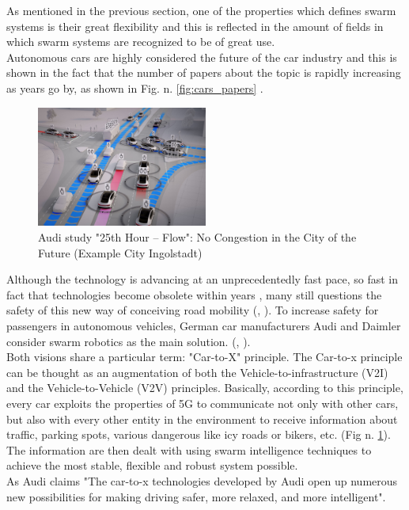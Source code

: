 \documentclass[conference]{IEEEtran}
\begin{document}
As mentioned in the previous section, one of the properties which defines swarm systems is their great flexibility and this is reflected in the amount of fields in which swarm systems are recognized to be of great use. \\
Autonomous cars are highly considered the future of the car industry and this is shown in the fact that the number of papers about the topic is rapidly increasing as years go by, as shown in Fig. n. \ref{fig:cars_papers} \cite{unknown}.\\
\begin{figure}[htb]
    \centering
    \includegraphics[width=0.5\textwidth]{img/future_city.jpg}
    \caption{Audi study "25th Hour – Flow": No Congestion in the City of the Future (Example City Ingolstadt) \cite{AUDI_CAR}}
    \label{fig:future_city}
\end{figure}
Although the technology is advancing at an unprecedentedly fast pace, so fast in fact that technologies become obsolete within years \cite{unknown}, many still questions the safety of this new way of conceiving road mobility (\cite{Johnson+2020+137+155}, \cite{robert_are_2019}). To increase safety for passengers in autonomous vehicles, German car manufacturers Audi and Daimler consider swarm robotics as the main solution. (\cite{AUDI_CAR}, \cite{daimler}).\\
Both visions share a particular term: "Car-to-X" principle. The Car-to-x principle can be thought as an augmentation of both the Vehicle-to-infrastructure (V2I) and the Vehicle-to-Vehicle (V2V) principles. Basically, according to this principle, every car exploits the properties of 5G to communicate not only with other cars, but also with every other entity in the environment to receive information about traffic, parking spots, various dangerous like icy roads or bikers, etc. (Fig n. \ref{fig:future_city}). 
The information are then dealt with using swarm intelligence techniques to achieve the most stable, flexible and robust system possible. \\
As Audi claims "The car-to-x technologies developed by Audi open up numerous new possibilities for making driving safer, more relaxed, and more intelligent"\cite{AUDI_CAR}. \\
\end{document}
